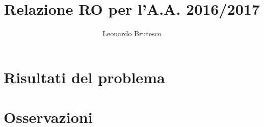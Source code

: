 \documentclass[11pt]{article}
\title{Relazione RO per l'A.A. 2016/2017}
\author{Leonardo Brutesco}
\begin{document}









	\section{Risultati del problema}
	\newpage

	\section{Osservazioni}
	\newpage



	
	\appendix

\listoffigures

	\newpage
\end{document}
